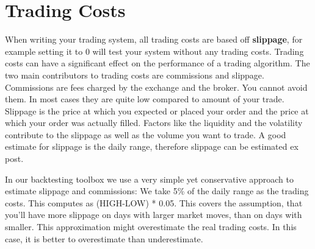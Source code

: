 \documentclass[letterpaper,10pt,english]{sphinxmanual}
\begin{document}
\section{Trading Costs}
\label{settings:trading-costs}
When writing your trading system, all trading costs are based off \textbf{slippage}, for example setting it to 0 will test your system without any trading costs. Trading costs can have a significant effect on the performance of a trading algorithm. The two main contributors to trading costs are commissions and slippage. Commissions are fees charged by the exchange and the broker. You cannot avoid them. In most cases they are quite low compared to amount of your trade. Slippage is the price at which you expected or placed your order and the price at which your order was actually filled. Factors like the liquidity and the volatility contribute to the slippage as well as the volume you want to trade. A good estimate for slippage is the daily range, therefore slippage can be estimated ex post.

In our backtesting toolbox we use a very simple yet conservative approach to estimate slippage and commissions: We take 5\% of the daily range as the trading costs. This computes as (HIGH-LOW) * 0.05. This covers the assumption, that you'll have more slippage on days with larger market moves, than on days with smaller. This approximation might overestimate the real trading costs. In this case, it is better to overestimate than underestimate.
\end{document}
